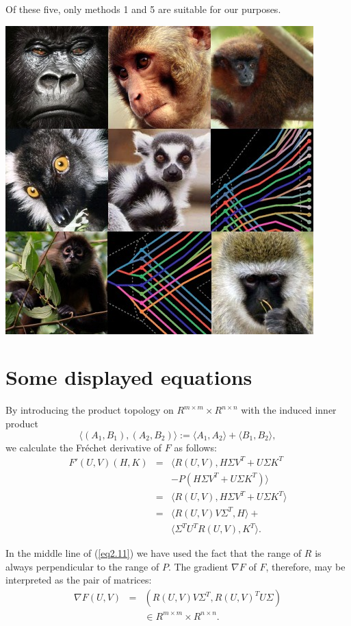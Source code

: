 \documentclass[myposter,portrait]{sciposter}
\def\mysection#1{
{\color{sectionCol}\section*{\sc\bfseries #1}}}
\begin{document}
\begin{multicols*}{3}
Of these five, only methods 1 and 5 are suitable for our purposes.

\includegraphics[width=\columnwidth]{allmonkeys}



\mysection{Some displayed equations}
     By introducing the product topology on  $R^{m \times m} \times
R^{n \times n}$  with the induced inner product
\begin{equation}
\langle (A_{1},B_{1}), (A_{2},B_{2})\rangle := \langle A_{1},A_{2}\rangle 
+ \langle B_{1},B_{2}\rangle,\label{eq2.10}
\end{equation}
we calculate the Fr\'{e}chet derivative of  $F$  as follows:
\begin{eqnarray}
 F'(U,V)(H,K) &=& \langle R(U,V),H\Sigma V^{T} + U\Sigma K^{T}\nonumber\\
             && - P(H\Sigma V^{T} + U\Sigma K^{T})\rangle \nonumber \\
         &=& \langle R(U,V),H\Sigma V^{T} + U\Sigma K^{T}\rangle\nonumber \\
&=& \langle R(U,V)V\Sigma^{T},H\rangle + \nonumber\\
  &&    \langle \Sigma^{T}U^{T}R(U,V),K^{T}\rangle.    \label{eq2.11}
\end{eqnarray}

In the middle line of (\ref{eq2.11}) we have used the fact that the range of
$R$ is always perpendicular to the range of $P$.  The gradient $\nabla F$  of
$F$, therefore,  may be interpreted as the
pair of matrices:
\begin{eqnarray}
 \nabla F(U,V) &=& (R(U,V)V\Sigma^{T},R(U,V)^{T}U\Sigma )\nonumber\\
 && \in R^{m \times m} \times R^{n \times n}.   \label{eq2.12}
\end{eqnarray}


\end{multicols*}
\end{document}
